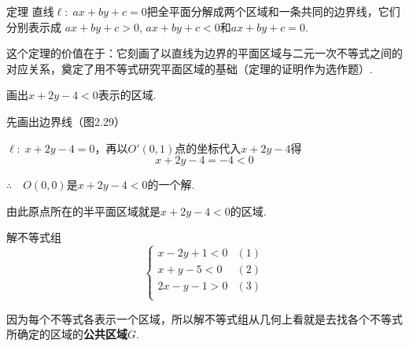 \begin{thm}
    {定理} 直线$\ell:\; ax+by+c=0$把全平面分解成两个区域和一条共同的边界线，它们分别表示成
$ax+by+c>0$, $ax+by+c<0$和$ax+by+c=0$.
\end{thm}

这个定理的价值在于：它刻画了以直线为边界的平面区域与二元一次不等式之间的对应关系，奠定了用不等式研究平面区域的基础（定理的证明作为选作题）.

\begin{example}
    画出$x+2y-4<0$表示的区域.
\end{example}

\noindent
\begin{minipage}{.47\textwidth}
\CTEXindent
\begin{solution}
    先画出边界线（图2.29）

$\ell:\; x+2y-4=0$，再以$O'(0,1)$点的坐标代入$x+2y-4$得
\[x+2y-4=-4<0\]

$\therefore\quad O(0,0)$是$x+2y-4<0$的一个解.

由此原点所在的半平面区域就是$x+2y-4<0$的区域.
\end{solution}

\end{minipage}\hfill
\begin{minipage}{.47\textwidth}
    \centering
{}    
\end{minipage}

\begin{example}
    解不等式组
\[\begin{cases}
    x-2y+1<0 & (1)\\
    x+y-5<0 & (2)\\
    2x-y-1>0 & (3)\\
\end{cases}\]
\end{example}

\begin{analyze}
因为每个不等式各表示一个区域，所以解不等式组从几何上看就是去找各个不等式所确定的区域的\textbf{公共区域$G$}.
\end{analyze}

